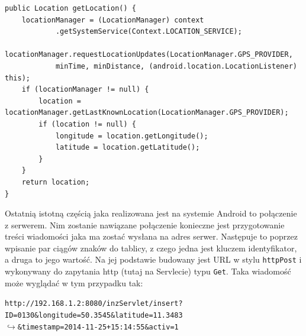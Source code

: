 \documentclass[eng,printmode,oneside]{mgr}
\begin{document}
 \begin{lstlisting}[caption=Pobieranie lokalizacji
kuriera metoda getLocation() z klasy GpsTrack,label=lst:GpsTrack.java]
public Location getLocation() {
	locationManager = (LocationManager) context
			.getSystemService(Context.LOCATION_SERVICE);
	locationManager.requestLocationUpdates(LocationManager.GPS_PROVIDER,
			minTime, minDistance, (android.location.LocationListener) this);
	if (locationManager != null) {
		location = locationManager.getLastKnownLocation(LocationManager.GPS_PROVIDER);
		if (location != null) {
			longitude = location.getLongitude();
			latitude = location.getLatitude();
		}
	}
	return location;
}
\end{lstlisting}

Ostatnią istotną częścią jaka realizowana jest na systemie Android to połączenie
z serwerem. Nim zostanie nawiązane połączenie konieczne jest przygotowanie
treści wiadomości jaka ma zostać wysłana na adres serwer. Następuje to poprzez
wpisanie par ciągów znaków do tablicy, z czego jedna jest kluczem identyfikator,
a druga to jego wartość. Na jej podstawie budowany jest URL w
stylu \texttt{httpPost} i wykonywany do zapytania http (tutaj na Servlecie) typu
\texttt{Get}. Taka wiadomość może wyglądać w tym przypadku tak:

\begin{flushright}
\texttt{http://192.168.1.2:8080/inzServlet/insert?ID=0130\&longitude=50.3545\&latitude=11.3483
\\$\hookrightarrow$\&timestamp=2014-11-25+15:14:55\&activ=1}
\end{flushright}
\end{document}
